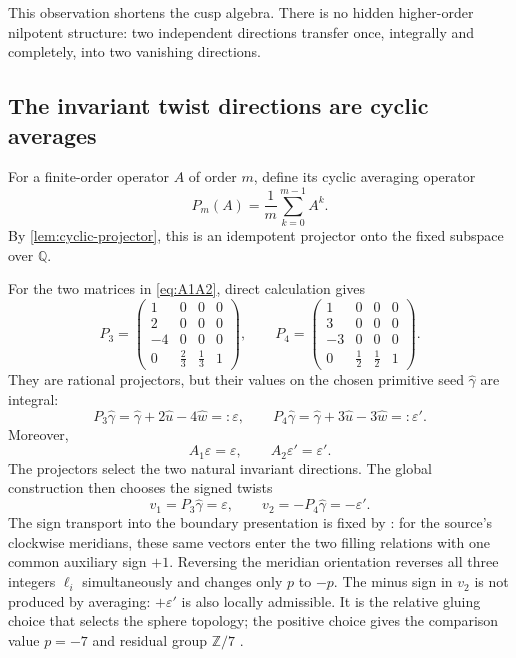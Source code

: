 \documentclass[11pt,reqno]{amsart}
\numberwithin{equation}{section}
\newcommand{\Z}{\mathbb Z}
\newcommand{\Q}{\mathbb Q}
\newcommand{\eps}{\varepsilon}
\newcommand{\epsp}{\varepsilon'}
\newcommand{\wideg}{\widehat\gamma}
\newcommand{\wideu}{\widehat u}
\newcommand{\widew}{\widehat w}
\theoremstyle{definition}
\begin{document}
This observation shortens the cusp algebra. There is no hidden higher-order nilpotent structure: two independent directions transfer once, integrally and completely, into two vanishing directions.

\subsection{The invariant twist directions are cyclic averages}\label{sec:projectors}

For a finite-order operator $A$ of order $m$, define its cyclic averaging operator
\[
P_m(A)=\frac1m\sum_{k=0}^{m-1}A^k.
\]
By \cref{lem:cyclic-projector}, this is an idempotent projector onto the fixed subspace over $\Q$.

For the two matrices in \cref{eq:A1A2}, direct calculation gives
\begin{equation}\label{eq:P3P4}
P_3=
\begin{pmatrix}
1&0&0&0\\
2&0&0&0\\
-4&0&0&0\\
0&\frac23&\frac13&1
\end{pmatrix},
\qquad
P_4=
\begin{pmatrix}
1&0&0&0\\
3&0&0&0\\
-3&0&0&0\\
0&\frac12&\frac12&1
\end{pmatrix}.
\end{equation}
They are rational projectors, but their values on the chosen primitive seed $\wideg$ are integral:
\begin{equation}\label{eq:projected-twists}
P_3\wideg=\wideg+2\wideu-4\widew=:\eps,
\qquad
P_4\wideg=\wideg+3\wideu-3\widew=:\epsp.
\end{equation}
Moreover,
\[
A_1\eps=\eps,
\qquad
A_2\epsp=\epsp.
\]
The projectors select the two natural invariant directions. The global construction then chooses the signed twists
\begin{equation}\label{eq:v1v2}
v_1=P_3\wideg=\eps,
\qquad
v_2=-P_4\wideg=-\epsp.
\end{equation}
The sign transport into the boundary presentation is fixed by \cite[Lem.~7.16]{S6}: for the source's clockwise meridians, these same vectors enter the two filling relations with one common auxiliary sign $+1$. Reversing the meridian orientation reverses all three integers $\ell_i$ simultaneously and changes only $p$ to $-p$. The minus sign in $v_2$ is not produced by averaging: $+\epsp$ is also locally admissible. It is the relative gluing choice that selects the sphere topology; the positive choice gives the comparison value $p=-7$ and residual group $\Z/7$ \cite[Thm.~7.17]{S6}.
\end{document}
